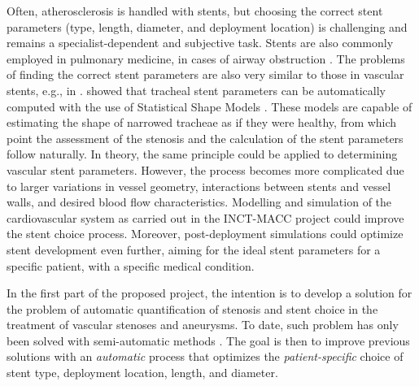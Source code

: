 \begin{sloppypar}
Often, atherosclerosis is handled with stents, but choosing the correct stent parameters (type, length, diameter, and deployment location) is challenging and remains a specialist-dependent and subjective task. Stents are also commonly employed in pulmonary medicine, in cases of airway obstruction \citep{Chin,Freitag1,Freitag2,Freitag3,LeeP,Saito,Venuta}. The problems of finding the correct stent parameters are also very similar to those in vascular stents, e.g., in \citep{Bemmel}. \citet{Pinho:Trachea4} showed that tracheal stent parameters can be automatically computed with the use of Statistical Shape Models \citep{Cootes}. These models are capable of estimating the shape of narrowed tracheae as if they were healthy, from which point the assessment of the stenosis and the calculation of the stent parameters follow naturally. In theory, the same principle could be applied to determining vascular stent parameters. However, the process becomes more complicated due to larger variations in vessel geometry, 
interactions between stents and vessel walls, and desired blood flow characteristics. Modelling and simulation of the cardiovascular system as carried out in the INCT-MACC project could improve the stent choice process. Moreover, post-deployment simulations could optimize stent development even further, aiming for the ideal stent parameters for a specific patient, with a specific medical condition. 
\end{sloppypar}

\begin{sloppypar}
In the first part of the proposed project, the intention is to develop a solution for the problem of automatic quantification of stenosis and stent choice in the treatment of vascular stenoses and aneurysms. To date, such problem has only been solved with semi-automatic methods \citep{Gremse01092011,Scherl200721,HERN-06b,Bemmel}. The goal is then to improve previous solutions with an {\em automatic} process that optimizes the {\em patient-specific} choice of stent type, deployment location, length, and diameter. 
\end{sloppypar}

